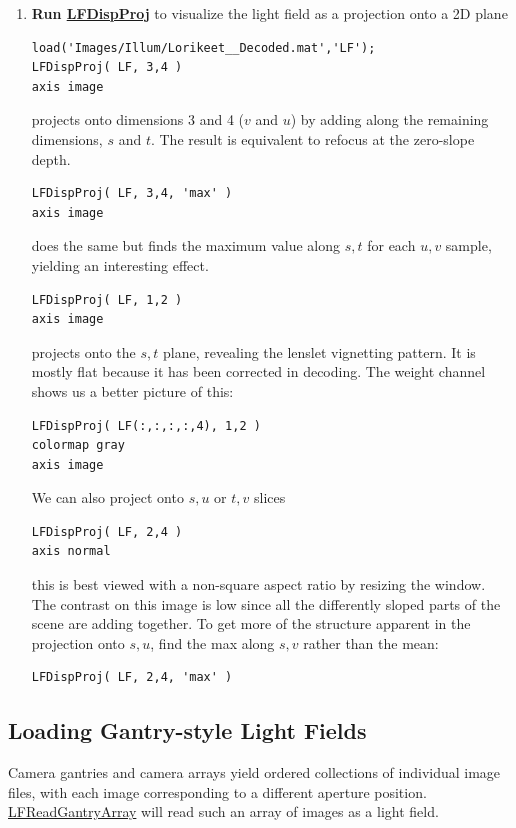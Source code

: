 \documentclass[onecolumn]{article}
\newcommand{\CiteFunc}[1]{\hyperlink{#1}{\small #1}}
\begin{document}
\begin{enumerate}[leftmargin=1.5em,rightmargin=0.5cm]
\item \textbf{Run \CiteFunc{LFDispProj}} to visualize the light field as a projection onto a 2D plane
\begin{Verbatim}
load('Images/Illum/Lorikeet__Decoded.mat','LF');
LFDispProj( LF, 3,4 )
axis image
\end{Verbatim}
projects onto dimensions 3 and 4 ($v$ and $u$) by adding along the remaining dimensions, $s$ and $t$. The result is equivalent to refocus at the zero-slope depth.
\begin{Verbatim}
LFDispProj( LF, 3,4, 'max' )
axis image
\end{Verbatim}
does the same but finds the maximum value along $s,t$ for each $u,v$ sample, yielding an interesting effect.
\begin{Verbatim}
LFDispProj( LF, 1,2 )
axis image
\end{Verbatim}
projects onto the $s,t$ plane, revealing the lenslet vignetting pattern. It is mostly flat because it has been corrected in decoding.  The weight channel shows us a better picture of this:
\begin{Verbatim}
LFDispProj( LF(:,:,:,:,4), 1,2 )
colormap gray
axis image
\end{Verbatim}
We can also project onto $s,u$ or $t,v$ slices
\begin{Verbatim}
LFDispProj( LF, 2,4 )
axis normal
\end{Verbatim}
this is best viewed with a non-square aspect ratio by resizing the window. The contrast on this image is low since all the differently sloped parts of the scene are adding together. To get more of the structure apparent in the projection onto $s,u$, find the max along $s,v$ rather than the mean:
\begin{Verbatim}
LFDispProj( LF, 2,4, 'max' )
\end{Verbatim}

\end{enumerate}

\subsection{Loading Gantry-style Light Fields}
\label{sect_LoadingGantryTour}

Camera gantries and camera arrays yield ordered collections of individual image files, with each image corresponding to a different aperture position. \CiteFunc{LFReadGantryArray} will read such an array of images as a light field.
\end{document}
